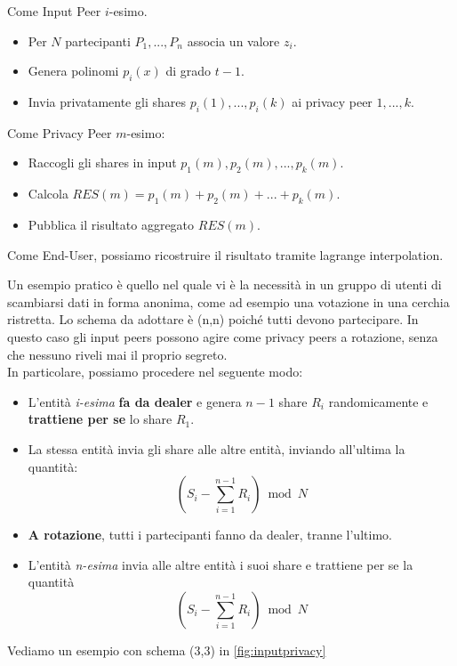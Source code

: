 \begin{theorem}
Come Input Peer $i$-esimo.\footnotemark
\begin{itemize}
    \item Per $N$ partecipanti $P_1,...,P_n$ associa un valore $z_i$.
    \item Genera polinomi $p_i(x)$ di grado $t-1$.
    \item Invia privatamente gli shares $p_i(1),...,p_i(k)$ ai privacy peer $1,...,k$.
\end{itemize}
Come Privacy Peer $m$-esimo:
\begin{itemize}
    \item Raccogli gli shares in input $p_1(m),p_2(m),...,p_k(m)$.
    \item Calcola $RES(m)=p_1(m)+p_2(m)+...+p_k(m)$.
    \item Pubblica il risultato aggregato $RES(m)$.
\end{itemize}
Come End-User, possiamo ricostruire il risultato tramite lagrange interpolation.
\end{theorem}
\begin{example}
Un esempio pratico è quello nel quale vi è la necessità in un gruppo di utenti di scambiarsi dati in forma anonima, come ad esempio una votazione in una cerchia ristretta. Lo schema da adottare è (n,n) poiché tutti devono partecipare. In questo caso gli input peers possono agire come privacy peers a rotazione, senza che nessuno riveli mai il proprio segreto.\\
In particolare, possiamo procedere nel seguente modo:
\begin{itemize}
    \item L'entità \textit{i-esima} \textbf{fa da dealer} e genera $n-1$ share $R_i$ randomicamente e \textbf{trattiene per se} lo share $R_1$.
    \item La stessa entità invia gli share alle altre entità, inviando all'ultima la quantità: \[(S_i-\sum_{i=1}^{n-1}R_i)\bmod N\]
    \item \textbf{A rotazione}, tutti i partecipanti fanno da dealer, tranne l'ultimo.
    \item L'entità \textit{n-esima} invia alle altre entità i suoi share e trattiene per se la quantità \[(S_i-\sum_{i=1}^{n-1}R_i)\bmod N\]
\end{itemize}
Vediamo un esempio con schema (3,3) in \cref{fig:inputprivacy}
\end{example}

